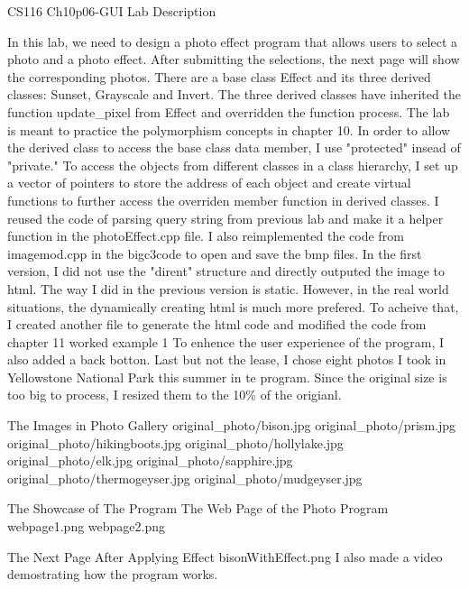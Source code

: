 

\tit CS116 Ch10p06-GUI
\sec Lab Description 

In this lab, we need to design a photo effect program that allows users to select a photo and a photo effect. 
After submitting the selections,
the next page will show the corresponding photos.
There are a base class Effect and its three derived classes: Sunset, Grayscale and Invert.
The three derived classes have inherited the function update\_pixel from Effect and overridden the function process.
The lab is meant to practice the polymorphism concepts in chapter 10.
In order to allow the derived class to access the base class data member, 
I use "protected" insead of "private."
To access the objects from different classes in a class hierarchy, 
I set up a vector of pointers to store the address of each object and 
create virtual functions to further access the overriden member function in derived classes.
I reused the code of parsing query string from previous lab and make it a helper function in the photoEffect.cpp file.
I also reimplemented the code from imagemod.cpp in the bigc3code to open and save the bmp files.
In the first version, I did not use the "dirent" structure and directly outputed the image to html.  
The way I did in the previous version is static. 
However, in the real world situations, the dynamically creating html is much more prefered. 
To acheive that, I created another file to generate the html code and modified the code from chapter 11 worked example 1
To enhence the user experience of the program, I also added a back botton.
Last but not the lease, I chose eight photos I took in Yellowstone National Park this summer in te program.
Since the original size is too big to process, I resized them to the 10\% of the origianl.


\filbreak
\sec The Images in Photo Gallery 
\picw=4in \inspic original_photo/bison.jpg
\picw=4in \inspic original_photo/prism.jpg
\picw=4in \inspic original_photo/hikingboots.jpg
\picw=4in \inspic original_photo/hollylake.jpg
\picw=4in \inspic original_photo/elk.jpg
\picw=4in \inspic original_photo/sapphire.jpg
\picw=4in \inspic original_photo/thermogeyser.jpg
\picw=4in \inspic original_photo/mudgeyser.jpg



\sec The Showcase of The Program
The Web Page of the Photo Program
\nl
\picw=5in \inspic webpage1.png
\nl
\filbreak
\picw=5in \inspic webpage2.png
\filbreak

The Next Page After Applying Effect 
\nl
\picw=4in \inspic bisonWithEffect.png
\nl
I also made a video demostrating how the program works. 

